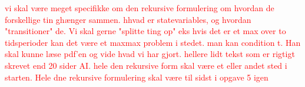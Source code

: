 \textcolor{red}{vi skal være meget specifikke om den rekursive formulering om hvordan de forskellige tin ghænger sammen. hhvad er statevariables, og hvordan "transitioner" de. Vi skal gerne "splitte ting op" eks hvis det er et max over to tidsperioder kan det være et max{max{}} problem i stedet. man kan condition t. Han skal kunne læse pdf'en og vide hvad vi har gjort. hellere lidt tekst som er rigtigt skrevet end 20 sider AI. hele den rekursive form skal være et eller andet sted i starten. Hele dne rekursive formulering skal være til sidst i opgave 5 igen}